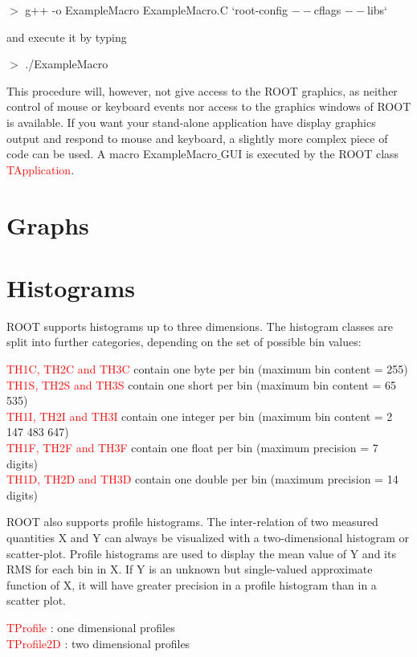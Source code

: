 \documentclass[12pt,a4paper]{article}
\begin{document}
$>$  g++ -o ExampleMacro ExampleMacro.C `root-config $--$cflags $--$libs`

and execute it by typing

$>$ ./ExampleMacro

This procedure will, however, not give access to the ROOT graphics, as neither control of mouse or keyboard events nor access to the graphics windows of ROOT is available. If you want your stand-alone application have display graphics output and respond to mouse and keyboard, a slightly more complex piece of code can be used. A macro ExampleMacro$\_$GUI is executed by the ROOT class \textcolor{red}{TApplication}.

\section{Graphs}

\section{Histograms}
ROOT supports histograms up to three dimensions. The histogram classes are split into further categories, depending on the set of possible bin values:

\textcolor{red}{TH1C, TH2C and TH3C} contain one byte per bin (maximum bin content = 255) \\
\textcolor{red}{TH1S, TH2S and TH3S} contain one short per bin (maximum bin content = 65 535) \\
\textcolor{red}{TH1I, TH2I and TH3I} contain one integer per bin (maximum bin content = 2 147 483 647) \\
\textcolor{red}{TH1F, TH2F and TH3F} contain one float per bin (maximum precision = 7 digits) \\
\textcolor{red}{TH1D, TH2D and TH3D} contain one double per bin (maximum precision = 14 digits)

ROOT also supports profile histograms. The inter-relation of two measured quantities X and Y can always be visualized with a two-dimensional histogram or scatter-plot. Profile histograms are used to display the mean value of Y and its RMS for each bin in X. If Y is an unknown but single-valued approximate function of X, it will have greater precision in a profile histogram than in a scatter plot.

\textcolor{red}{TProfile} : one dimensional profiles \\
\textcolor{red}{TProfile2D} : two dimensional profiles
\end{document}
